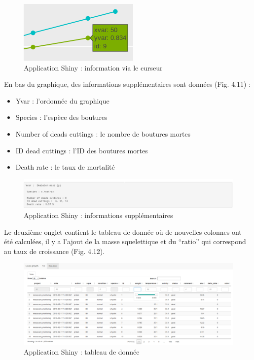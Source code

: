 \documentclass[]{report}
\providecommand{\tightlist}{%
  \setlength{\itemsep}{0pt}\setlength{\parskip}{0pt}}
\begin{document}
\begin{figure}[h!]
\includegraphics[]{../image/info-curseur.PNG}
\caption{Application Shiny : information via le curseur}
\end{figure}

En bas du graphique, des informations supplémentaires sont données (Fig.
4.11) :

\begin{itemize}
\tightlist
\item
  Yvar : l'ordonnée du graphique
\item
  Species : l'espèce des boutures
\item
  Number of deads cuttings : le nombre de boutures mortes
\item
  ID dead cuttings : l'ID des boutures mortes
\item
  Death rate : le taux de mortalité
\end{itemize}

\begin{figure}[h!]
\includegraphics[]{../image/verbatim.PNG}
\caption{Application Shiny : informations supplémentaires}
\end{figure}

Le deuxième onglet contient le tableau de donnée où de nouvelles
colonnes ont été calculées, il y a l'ajout de la masse squelettique et
du ``ratio'' qui correspond au taux de croissance (Fig. 4.12).

\begin{figure}[h!]
\includegraphics[]{../image/notebook-table1.png}
\caption{Application Shiny : tableau de donnée}
\end{figure}
\end{document}

